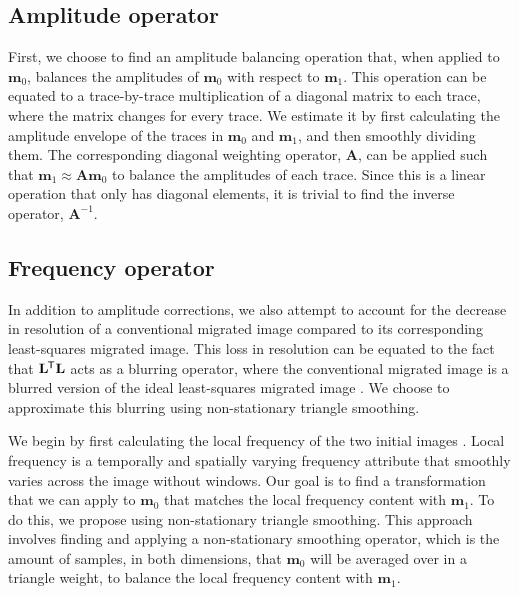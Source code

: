 \subsection{Amplitude operator}
    First, we choose to find an amplitude balancing operation that, when applied to $\mathbf{m}_0$, balances the amplitudes of $\mathbf{m}_0$ with respect to $\mathbf{m}_1$. 
    This operation can be equated to a trace-by-trace multiplication of a diagonal matrix to each trace, where the matrix changes for every trace.
    We estimate it by first calculating the amplitude envelope of the traces in $\mathbf{m}_0$ and $\mathbf{m}_1$, and then smoothly dividing them.
    The corresponding diagonal weighting operator, $\mathbf{A}$, can be applied such that $\mathbf{m}_1 \approx \mathbf{A}\mathbf{m}_0$ to balance the amplitudes of each trace.
    Since this is a linear operation that only has diagonal elements, it is trivial to find the inverse operator, $\mathbf{A}^{-1}$. 

\subsection{Frequency operator}
    In addition to amplitude corrections, we also attempt to account for the decrease in resolution of a conventional migrated image compared to its corresponding least-squares migrated image. 
    This loss in resolution can be equated to the fact that $\mathbf{L}^{\mkern-1.5mu\mathsf{T}}\mathbf{L}$ acts as a blurring operator, where the conventional migrated image is a blurred version of the ideal least-squares migrated image \cite[]{poststack}. 
    We choose to approximate this blurring using non-stationary triangle smoothing.

    We begin by first calculating the local frequency of the two initial images \cite[]{attr}. 
    Local frequency is a temporally and spatially varying frequency attribute that smoothly varies across the image without windows.
    Our goal is to find a transformation that we can apply to $\mathbf{m}_0$ that matches the local frequency content with $\mathbf{m}_1$. 
    To do this, we propose using non-stationary triangle smoothing. 
    This approach involves finding and applying a non-stationary smoothing operator, which is the amount of samples, in both dimensions, that $\mathbf{m}_0$ will be averaged over in a triangle weight, to balance the local frequency content with $\mathbf{m}_1$. 
    
